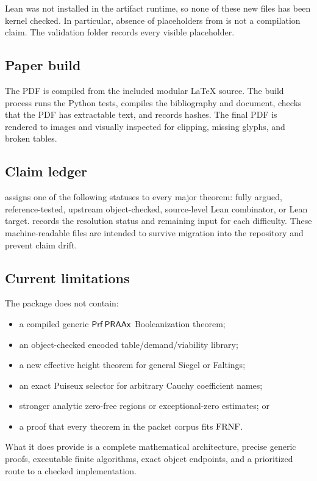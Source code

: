 Lean was not installed in the artifact runtime, so none of these new files has been
kernel checked.  In particular, absence of placeholders from  is not
a compilation claim.  The validation folder records every visible placeholder.

\subsection{Paper build}

The PDF is compiled from the included modular LaTeX source.  The build process runs the
Python tests, compiles the bibliography and document, checks that the PDF has extractable
text, and records hashes.  The final PDF is rendered to images and visually inspected
for clipping, missing glyphs, and broken tables.

\subsection{Claim ledger}

 assigns one of the following statuses to every
major theorem: fully argued, reference-tested, upstream object-checked, source-level
Lean combinator, or Lean target.   records the
resolution status and remaining input for each difficulty.  These machine-readable
files are intended to survive migration into the repository and prevent claim drift.

\subsection{Current limitations}

The package does not contain:

\begin{itemize}
\item a compiled generic \(\mathsf{Prf}\,\mathsf{PRAAx}\) Booleanization theorem;
\item an object-checked encoded table/demand/viability library;
\item a new effective height theorem for general Siegel or Faltings;
\item an exact Puiseux selector for arbitrary Cauchy coefficient names;
\item stronger analytic zero-free regions or exceptional-zero estimates; or
\item a proof that every theorem in the packet corpus fits \(\mathrm{FRNF}\).
\end{itemize}

What it does provide is a complete mathematical architecture, precise generic proofs,
executable finite algorithms, exact object endpoints, and a prioritized route to a
checked implementation.

